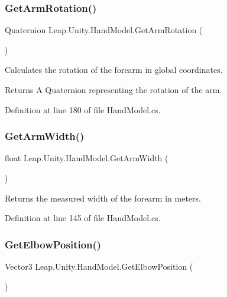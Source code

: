 \mbox{\label{class_leap_1_1_unity_1_1_hand_model_a2bea9f9359bb0eb9f2a66a1e2a7c889f}} 
\subsubsection{\texorpdfstring{GetArmRotation()}{GetArmRotation()}}
{\footnotesize\ttfamily Quaternion Leap.\+Unity.\+Hand\+Model.\+Get\+Arm\+Rotation (\begin{DoxyParamCaption}{ }\end{DoxyParamCaption})}

Calculates the rotation of the forearm in global coordinates. \begin{DoxyReturn}{Returns}
A Quaternion representing the rotation of the arm. 
\end{DoxyReturn}


Definition at line 180 of file Hand\+Model.\+cs.

\mbox{\label{class_leap_1_1_unity_1_1_hand_model_ab6e83399ea1b0940cb8053d8484de6b9}} 
\subsubsection{\texorpdfstring{GetArmWidth()}{GetArmWidth()}}
{\footnotesize\ttfamily float Leap.\+Unity.\+Hand\+Model.\+Get\+Arm\+Width (\begin{DoxyParamCaption}{ }\end{DoxyParamCaption})}

Returns the measured width of the forearm in meters. 

Definition at line 145 of file Hand\+Model.\+cs.

\mbox{\label{class_leap_1_1_unity_1_1_hand_model_a453ef9c288145200df70ba1781b80329}} 
\subsubsection{\texorpdfstring{GetElbowPosition()}{GetElbowPosition()}}
{\footnotesize\ttfamily Vector3 Leap.\+Unity.\+Hand\+Model.\+Get\+Elbow\+Position (\begin{DoxyParamCaption}{ }\end{DoxyParamCaption})}

